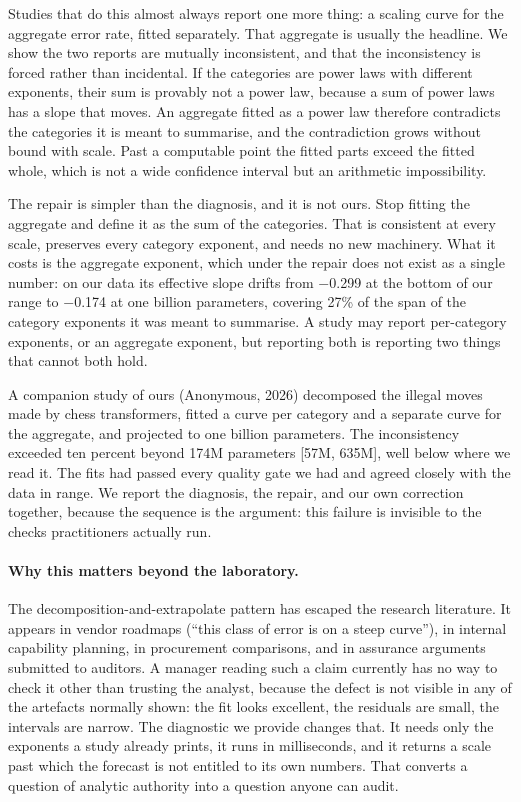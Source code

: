 \documentclass[11pt]{article}
\begin{document}
Studies that do this almost always report one more thing: a scaling curve for the
aggregate error rate, fitted separately. That aggregate is usually the headline. We
show the two reports are mutually inconsistent, and that the inconsistency is forced
rather than incidental. If the categories are power laws with different exponents,
their sum is provably not a power law, because a sum of power laws has a slope that
moves. An aggregate fitted as a power law therefore contradicts the categories it is
meant to summarise, and the contradiction grows without bound with scale. Past a
computable point the fitted parts exceed the fitted whole, which is not a wide
confidence interval but an arithmetic impossibility.

The repair is simpler than the diagnosis, and it is not ours. Stop fitting the
aggregate and define it as the sum of the categories. That is consistent at every
scale, preserves every category exponent, and needs no new machinery. What it costs
is the aggregate exponent, which under the repair does not exist as a single number:
on our data its effective slope drifts from $-$0.299 at the bottom of
our range to $-$0.174 at one billion parameters, covering
27\% of the span of the category exponents it was meant to
summarise. A study may report per-category exponents, or an aggregate exponent, but
reporting both is reporting two things that cannot both hold.

A companion study of ours
 (Anonymous, 2026){} decomposed the illegal
moves made by chess transformers, fitted a curve per category and a separate curve
for the aggregate, and projected to one billion parameters. The inconsistency
exceeded ten percent beyond 174M parameters
[57M, 635M], well below where we read it. The
fits had passed every quality gate we had and agreed closely with the data in range.
We report the diagnosis, the repair, and our own correction together, because the
sequence is the argument: this failure is invisible to the checks practitioners
actually run.

\paragraph{Why this matters beyond the laboratory.}
The decomposition-and-extrapolate pattern has escaped the research literature. It
appears in vendor roadmaps (``this class of error is on a steep curve''), in
internal capability planning, in procurement comparisons, and in assurance
arguments submitted to auditors. A manager reading such a claim currently has no
way to check it other than trusting the analyst, because the defect is not visible
in any of the artefacts normally shown: the fit looks excellent, the residuals are
small, the intervals are narrow. The diagnostic we provide changes that. It needs
only the exponents a study already prints, it runs in milliseconds, and it returns
a scale past which the forecast is not entitled to its own numbers. That converts a
question of analytic authority into a question anyone can audit.
\end{document}

